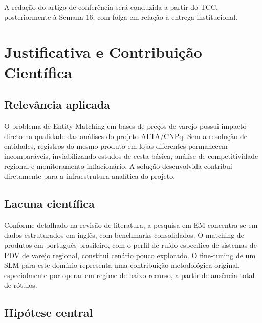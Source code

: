 \documentclass[
    article,
    12pt,
    oneside,
    a4paper,
    english,
    brazilian
    ]{abntex2}
\numberwithin{equation}{section}
\begin{document}


A redação do artigo de conferência será conduzida a partir do TCC, posteriormente à Semana 16, com folga em relação à entrega institucional.

\section{Justificativa e Contribuição Científica}

\subsection{Relevância aplicada}

O problema de Entity Matching em bases de preços de varejo possui impacto direto na qualidade das análises do projeto ALTA/CNPq. Sem a resolução de entidades, registros do mesmo produto em lojas diferentes permanecem incomparáveis, inviabilizando estudos de cesta básica, análise de competitividade regional e monitoramento inflacionário. A solução desenvolvida contribui diretamente para a infraestrutura analítica do projeto.

\subsection{Lacuna científica}

Conforme detalhado na revisão de literatura, a pesquisa em EM concentra-se em dados estruturados em inglês, com benchmarks consolidados. O matching de produtos em português brasileiro, com o perfil de ruído específico de sistemas de PDV de varejo regional, constitui cenário pouco explorado. O fine-tuning de um SLM para este domínio representa uma contribuição metodológica original, especialmente por operar em regime de baixo recurso, a partir de ausência total de rótulos.

\subsection{Hipótese central}
\label{sec:hipotese-central}
\end{document}
